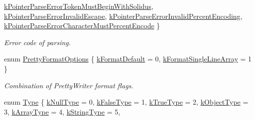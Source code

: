 \begin{DoxyCompactItemize}
\mbox{\hyperlink{group___r_a_p_i_d_j_s_o_n___e_r_r_o_r_s_ggade540ee4cc2a416c23b8ee2c12393c7ba2f2f8b238e201b7d540e8914bbfd2bed}{k\+Pointer\+Parse\+Error\+Token\+Must\+Begin\+With\+Solidus}}, 
\mbox{\hyperlink{group___r_a_p_i_d_j_s_o_n___e_r_r_o_r_s_ggade540ee4cc2a416c23b8ee2c12393c7ba907c9fe4e541b257513e3a18635379f7}{k\+Pointer\+Parse\+Error\+Invalid\+Escape}}, 
\mbox{\hyperlink{group___r_a_p_i_d_j_s_o_n___e_r_r_o_r_s_ggade540ee4cc2a416c23b8ee2c12393c7ba29831a02b8ee23a05d552b47f4d64d28}{k\+Pointer\+Parse\+Error\+Invalid\+Percent\+Encoding}}, 
\newline
\mbox{\hyperlink{group___r_a_p_i_d_j_s_o_n___e_r_r_o_r_s_ggade540ee4cc2a416c23b8ee2c12393c7bae244a98f53279fda5a750f847b81c54f}{k\+Pointer\+Parse\+Error\+Character\+Must\+Percent\+Encode}}
 \}
\begin{DoxyCompactList}\small\item\em Error code of parsing. \end{DoxyCompactList}\item 
enum \mbox{\hyperlink{namespacerapidjson_a084b31753ef2edefdeca8a5374eccc4b}{Pretty\+Format\+Options}} \{ \mbox{\hyperlink{namespacerapidjson_a084b31753ef2edefdeca8a5374eccc4ba8164b0d4993439856171585b9cf3adc0}{k\+Format\+Default}} = 0, 
\mbox{\hyperlink{namespacerapidjson_a084b31753ef2edefdeca8a5374eccc4ba64b0f8a37ab3125118682046ff06500f}{k\+Format\+Single\+Line\+Array}} = 1
 \}
\begin{DoxyCompactList}\small\item\em Combination of Pretty\+Writer format flags. \end{DoxyCompactList}\item 
enum \mbox{\hyperlink{namespacerapidjson_ae79a4751c1c460ff0de5ecc07874f3e4}{Type}} \{ \newline
\mbox{\hyperlink{namespacerapidjson_ae79a4751c1c460ff0de5ecc07874f3e4a952871e4326b527154fc8aac1ac1f6ff}{k\+Null\+Type}} = 0, 
\mbox{\hyperlink{namespacerapidjson_ae79a4751c1c460ff0de5ecc07874f3e4a9f2e7047832dce1029551b5de0f05607}{k\+False\+Type}} = 1, 
\mbox{\hyperlink{namespacerapidjson_ae79a4751c1c460ff0de5ecc07874f3e4a80d9f25b083abce45edbfdd3ba006c8e}{k\+True\+Type}} = 2, 
\mbox{\hyperlink{namespacerapidjson_ae79a4751c1c460ff0de5ecc07874f3e4acf030b422a32c3647c7c5973bd4dd0a9}{k\+Object\+Type}} = 3, 
\newline
\mbox{\hyperlink{namespacerapidjson_ae79a4751c1c460ff0de5ecc07874f3e4a058c622e1e7d59419ae58b895cbce468}{k\+Array\+Type}} = 4, 
\mbox{\hyperlink{namespacerapidjson_ae79a4751c1c460ff0de5ecc07874f3e4ad6379da3dc04b83a591992bfb9fabba7}{k\+String\+Type}} = 5, 

\end{DoxyCompactItemize}
